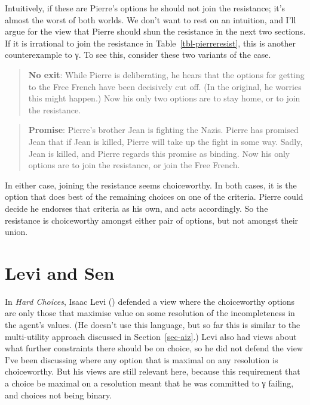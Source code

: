 \documentclass[
  11pt,
  letterpaper,
  DIV=11,
  numbers=noendperiod,
  twoside]{scrartcl}
\begin{document}
Intuitively, if these are Pierre's options he should not join the
resistance; it's almost the worst of both worlds. We don't want to rest
on an intuition, and I'll argue for the view that Pierre should shun the
resistance in the next two sections. If it is irrational to join the
resistance in Table~\ref{tbl-pierreresist}, this is another
counterexample to γ. To see this, consider these two variants of the
case.

\begin{quote}
\textbf{No exit}: While Pierre is deliberating, he hears that the
options for getting to the Free French have been decisively cut off. (In
the original, he worries this might happen.) Now his only two options
are to stay home, or to join the resistance.
\end{quote}

\begin{quote}
\textbf{Promise}: Pierre's brother Jean is fighting the Nazis. Pierre
has promised Jean that if Jean is killed, Pierre will take up the fight
in some way. Sadly, Jean is killed, and Pierre regards this promise as
binding. Now his only options are to join the resistance, or join the
Free French.
\end{quote}

In either case, joining the resistance seems choiceworthy. In both
cases, it is the option that does best of the remaining choices on one
of the criteria. Pierre could decide he endorses that criteria as his
own, and acts accordingly. So the resistance is choiceworthy amongst
either pair of options, but not amongst their union.

\section{Levi and Sen}\label{sec-levisen}

In \emph{Hard Choices}, Isaac Levi ()
defended a view where the choiceworthy options are only those that
maximise value on some resolution of the incompleteness in the agent's
values. (He doesn't use this language, but so far this is similar to the
multi-utility approach discussed in Section~\ref{sec-aiz}.) Levi also
had views about what further constraints there should be on choice, so
he did not defend the view I've been discussing where any option that is
maximal on any resolution is choiceworthy. But his views are still
relevant here, because this requirement that a choice be maximal on a
resolution meant that he was committed to γ failing, and choices not
being binary.
\end{document}

